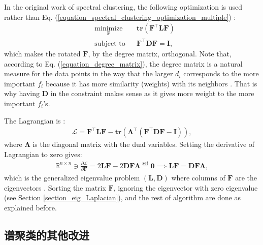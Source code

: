 \documentclass[lang=cn,10pt]{gorgeousnbook}
\numberwithin{equation}{section}%
\numberwithin{figure}{section}%
\begin{document}
In the original work of spectral clustering, the following optimization is used rather than Eq. (\ref{equation_spectral_clustering_optimization_multiple}) \cite{shi1997normalized}:
\begin{equation}\label{equation_spectral_clustering_optimization_multiple_2}
\begin{aligned}
& \underset{\boldsymbol{F}}{\text{minimize}}
& & \textbf{tr}(\boldsymbol{F}^\top \boldsymbol{L} \boldsymbol{F}) \\
& \text{subject to}
& & 
\boldsymbol{F}^\top \boldsymbol{D} \boldsymbol{F} = \boldsymbol{I},
\end{aligned}
\end{equation}
which makes the rotated $\boldsymbol{F}$, by the degree matrix, orthogonal. Note that, according to Eq. (\ref{equation_degree_matrix}), the degree matrix is a natural measure for the data points in the way that the larger $d_i$ corresponds to the more important $f_i$ because it has more similarity (weights) with its neighbors \cite{he2004locality}. That is why having $\boldsymbol{D}$ in the constraint makes sense as it gives more weight to the more important $f_i$'s.

The Lagrangian is \cite{boyd2004convex}:
\begin{align*}
\mathcal{L} = \boldsymbol{F}^\top \boldsymbol{L} \boldsymbol{F} - \textbf{tr}(\boldsymbol{\Lambda}^\top (\boldsymbol{F}^\top \boldsymbol{D} \boldsymbol{F} - \boldsymbol{I})),
\end{align*}
where $\boldsymbol{\Lambda}$ is the diagonal matrix with the dual variables. Setting the derivative of Lagrangian to zero gives:
\begin{align}
\mathbb{R}^{n \times n} \ni \frac{\partial \mathcal{L}}{\partial \boldsymbol{F}} = 2 \boldsymbol{L} \boldsymbol{F} - 2 \boldsymbol{D} \boldsymbol{F} \boldsymbol{\Lambda} \overset{\text{set}}{=} \boldsymbol{0} \implies \boldsymbol{L} \boldsymbol{F} = \boldsymbol{D} \boldsymbol{F} \boldsymbol{\Lambda},
\end{align}
which is the generalized eigenvalue problem $(\boldsymbol{L}, \boldsymbol{D})$ where columns of $\boldsymbol{F}$ are the eigenvectors \cite{ghojogh2019eigenvalue}. 
Sorting the matrix $\boldsymbol{F}$, ignoring the eigenvector with zero eigenvalue (see Section \ref{section_eig_Laplacian}), and the rest of algorithm are done as explained before. 


\subsection{谱聚类的其他改进}
\end{document}
